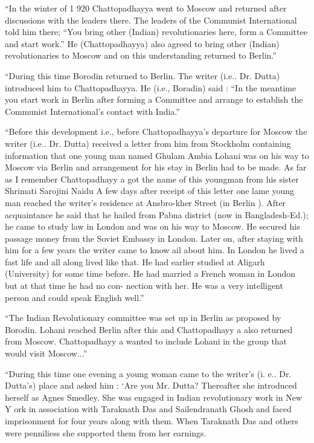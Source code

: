 “In the winter of 1 920 Chattopadhayya went to Moscow and returned after discussions with the leaders there. The leaders of the Communist International told him there; “You bring other (Indian) revolutionaries here, form a Committee and start work.” He (Chattopadhayya) also agreed to bring other (Indian) revolutionaries to Moscow and on this understanding returned to Berlin.” 

“During this time Borodin returned to Berlin. The writer (i.e.. Dr. Dutta) introduced him to Chattopadhayya. He (i.e., Boradin) said : “In the meantime you start work in Berlin after forming a Committee and arrange to establish the Communist International’s contact with India.” 

“Before this development i.e., before Chattopadhayya’s departure for Moscow the writer (i.e.. Dr. Dutta) received a letter from him from Stockholm containing information that one young man named Ghulam Ambia Lohani was on his way to Moscow via Berlin and arrangement for his stay 
in Berlin had to be made. As far as I remember Chattopadhayy a got the name of this youngman from his sister Shrimati 
Sarojini Naidu A few days after receipt of this letter one lame young man reached the writer’s residence at Ansbro-kher Street (in Berlin ). After acquaintance he said that he hailed from Pabna district (now in Bangladesh-Ed.); he came to study law in London and was on his way to Moscow. He secured his passage money from the Soviet Embassy in London. Later on, after staying with him for a few years the 
writer came to know ail about him. In London he lived a fast life and all along lived like that. He had earlier studied at Aligarh (University) for some time before. He had married a French woman in London but at that time he had no con- nection with her. He was a very intelligent person and could speak English well.” 

“The Indian Revolutionary committee was set up in Berlin as proposed by Borodin. Lohani reached Berlin after this and Chattopadhayy a also returned from Moscow. Chattopadhayy a wanted to include Lohani in the group that would visit Moscow...” 

“During this time one evening a young woman came to the writer’s (i. e.. Dr. Dutta’s) place and asked him : ‘Are you Mr. Dutta? Thereafter she introduced herself as Agnes Smedley. She was engaged in Indian revolutionary work in New Y ork in association with Taraknath Das and Sailendranath Ghosh and faced imprisonment for four years along with them. When Taraknath Das and others were penniliess she 
supported them from her earnings. 


